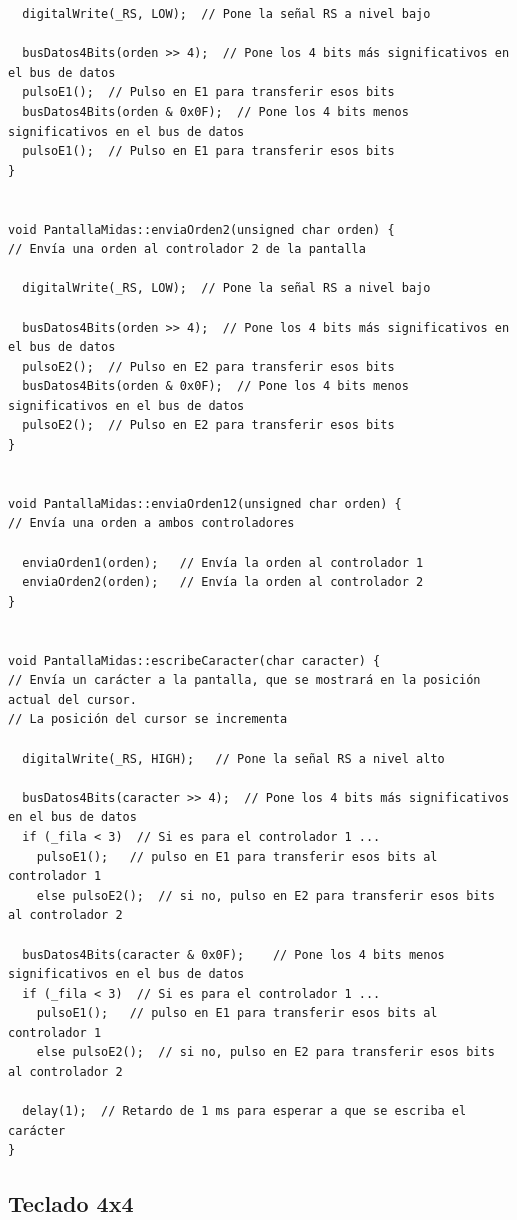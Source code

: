 \documentclass[11pt,twoside]{book}
\begin{document}
\begin{lstlisting}
  digitalWrite(_RS, LOW);  // Pone la señal RS a nivel bajo
  
  busDatos4Bits(orden >> 4);  // Pone los 4 bits más significativos en el bus de datos
  pulsoE1();  // Pulso en E1 para transferir esos bits
  busDatos4Bits(orden & 0x0F);  // Pone los 4 bits menos significativos en el bus de datos
  pulsoE1();  // Pulso en E1 para transferir esos bits
}


void PantallaMidas::enviaOrden2(unsigned char orden) {
// Envía una orden al controlador 2 de la pantalla

  digitalWrite(_RS, LOW);  // Pone la señal RS a nivel bajo
  
  busDatos4Bits(orden >> 4);  // Pone los 4 bits más significativos en el bus de datos
  pulsoE2();  // Pulso en E2 para transferir esos bits
  busDatos4Bits(orden & 0x0F);  // Pone los 4 bits menos significativos en el bus de datos
  pulsoE2();  // Pulso en E2 para transferir esos bits
}


void PantallaMidas::enviaOrden12(unsigned char orden) {
// Envía una orden a ambos controladores

  enviaOrden1(orden);   // Envía la orden al controlador 1
  enviaOrden2(orden);   // Envía la orden al controlador 2
}


void PantallaMidas::escribeCaracter(char caracter) {
// Envía un carácter a la pantalla, que se mostrará en la posición actual del cursor. 
// La posición del cursor se incrementa

  digitalWrite(_RS, HIGH);   // Pone la señal RS a nivel alto
  
  busDatos4Bits(caracter >> 4);  // Pone los 4 bits más significativos en el bus de datos
  if (_fila < 3)  // Si es para el controlador 1 ...
    pulsoE1();   // pulso en E1 para transferir esos bits al controlador 1
    else pulsoE2();  // si no, pulso en E2 para transferir esos bits al controlador 2
    
  busDatos4Bits(caracter & 0x0F);    // Pone los 4 bits menos significativos en el bus de datos
  if (_fila < 3)  // Si es para el controlador 1 ...
    pulsoE1();   // pulso en E1 para transferir esos bits al controlador 1
    else pulsoE2();  // si no, pulso en E2 para transferir esos bits al controlador 2
    
  delay(1);  // Retardo de 1 ms para esperar a que se escriba el carácter
}
\end{lstlisting}

\subsection{Teclado 4x4}
\end{document}
